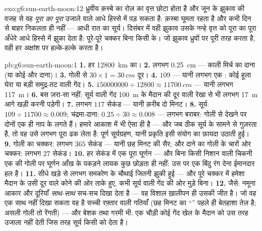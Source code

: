 \begin{solution}{exo:g6:sun-earth-moon:12}
ध्रुवीय क़स्बे का रोज़ का वृत्त छोटा होता है और जून के झुकाव की वजह
से वह \emph{पूरा का पूरा} उजाले वाले आधे हिस्से में पड़ सकता है:
क़स्बा घूमता रहता है और कभी दिन से बाहर निकलता ही नहीं --- आधी रात का
सूर्य। दिसंबर में वही झुकाव उसके नन्हे वृत्त को पूरा का पूरा अँधेरे
आधे हिस्से में झुका देता है: पूरे-पूरे चक्कर बिना किसी  के।
जो झुकाव ध्रुवों पर पूरी तरह करता है, वही हर अक्षांश पर हल्के-हल्के
करता है।
\end{solution}

\begin{solution}{pb:g6:sun-earth-moon:1}
\textbf{1.} हर  \qty{12800}{km} का।
\textbf{2.} लगभग \qty{0.25}{cm} --- काली मिर्च का दाना (या कोई और
दाना)।
\textbf{3.} गोली से $30 \times 1 = \qty{30}{cm}$ दूर।
\textbf{4.} $109$  --- यानी लगभग एक : कोई हूला घेरा या
बड़ी समुद्र-तट वाली गेंद।
\textbf{5.} $150000000 \div 12800 \approx \qty{11700}{cm}$ ---
यानी लगभग \qty{117}{m}।
\textbf{6.} बस ज़रा-सा नहीं: सूर्य वाली गेंद \qty{100}{m} के मैदान की
दूर वाली रेखा से भी लगभग \qty{17}{m} आगे खड़ी करनी पड़ेगी।
\textbf{7.} लगभग $117$ सेकंड --- यानी क़रीब दो मिनट।
\textbf{8.} सूर्य: $109 \div 11700 \approx 0.009$; चंद्रमा-दाना:
$0.25 \div 30 \approx 0.008$ --- लगभग बराबर: गोली से देखने पर दोनों
एक ही नाप के लगते हैं। हमारे आकाश में भी ऐसा ही है --- और जब 
ठीक सूर्य के सामने से गुज़रता है, तो वह उसे लगभग पूरा ढक लेता है: पूर्ण
सूर्यग्रहण, यानी प्रकृति इसी संयोग का फ़ायदा उठाती हुई।
\textbf{9.} गोली का चक्कर: लगभग $365$ सेकंड --- यानी छह मिनट की सैर;
और दाने का गोली के चारों ओर चक्कर: लगभग $27$ सेकंड।
\textbf{10.} हर सेकंड में एक पूरा घूर्णन --- और बिना किसी निशान वाली
चिकनी एक  की गोली पर घूर्णन आँख के पकड़ने लायक कुछ छोड़ता ही
नहीं: उस पर एक बिंदु रंग देना ईमानदार हल है।
\textbf{11.} सीधे खड़े से लगभग समकोण के चौथाई जितनी झुकी हुई --- और
पूरे चक्कर में हमेशा मैदान के उसी दूर वाले कोने की ओर ताके हुए, कभी
सूर्य वाली गेंद की ओर मुड़े बिना।
\textbf{12.} जैसे: नमूना आकार और दूरियाँ \emph{साथ-साथ} सच-सच दिखा
देता है --- वह विशाल ख़ालीपन ही उसकी जीत है। जो वह एक साथ नहीं दिखा
सकता वह है सच्ची रफ़्तार वाली गतियाँ (छह मिनट का ``'' पहले ही
बेतहाशा तेज़ है; असली गोली तो रेंगती) --- और बेशक  तथा गरमी भी:
एक  चौड़ी कोई गेंद खेल के मैदान को उस तरह उजाला नहीं देती जिस तरह
सूर्य किसी  को देता है।
\end{solution}
